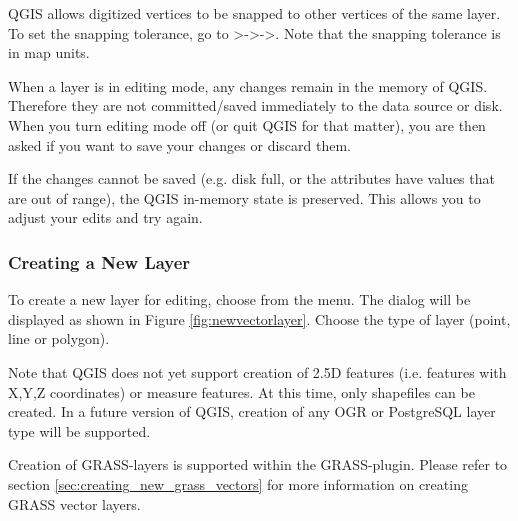 QGIS allows digitized vertices to be snapped to other vertices of the same layer. To 
set the snapping tolerance, go to
>->->.
Note that the snapping tolerance is in map units.


When a layer is in editing mode, any changes remain in the memory of QGIS.
Therefore they are not committed/saved immediately to the data source or disk.
When you turn editing mode off (or quit QGIS for that matter), 
you are then asked if you want to save your
changes or discard them.

If the changes cannot be saved (e.g. disk full, or the attributes have
values that are out of range), the QGIS in-memory state is preserved.  This
allows you to adjust your edits and try again.

\subsubsection{Creating a New Layer}\label{sec:create shape}

To create a new layer for editing, choose  from the
 menu. 
The  dialog will be displayed as
shown in Figure \ref{fig:newvectorlayer}. Choose the type of layer (point,
line or polygon).


Note that QGIS does not yet support creation of 2.5D
features (i.e. features with X,Y,Z coordinates) or measure features. At this
time, only shapefiles can be created. In a future version of QGIS, creation of
any OGR or PostgreSQL layer type will be supported. 

Creation of GRASS-layers is supported within the GRASS-plugin. Please refer to section
\ref{sec:creating_new_grass_vectors} for more information on creating GRASS vector 
layers.

